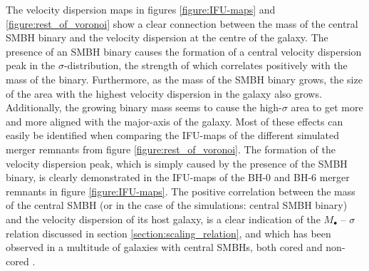 \documentclass[english, twoside]{HYgradu}
\begin{document}
The velocity dispersion maps in figures \ref{figure:IFU-maps} and \ref{figure:rest_of_voronoi} show a clear connection between the mass of the central SMBH binary and the velocity dispersion at the centre of the galaxy. The presence of an SMBH binary causes the formation of a central velocity dispersion peak in the $\sigma$-distribution, the strength of which correlates positively with the mass of the binary. Furthermore, as the mass of the SMBH binary grows, the size of the area with the highest velocity dispersion in the galaxy also grows. Additionally, the growing binary mass seems to cause the high-$\sigma$ area to get more and more aligned with the major-axis of the galaxy. Most of these effects can easily be identified when comparing the IFU-maps of the different simulated merger remnants from figure \ref{figure:rest_of_voronoi}. The formation of the velocity dispersion peak, which is simply caused by the presence of the SMBH binary, is clearly demonstrated in the IFU-maps of the BH-0 and BH-6 merger remnants in figure \ref{figure:IFU-maps}. The positive correlation between the mass of the central SMBH (or in the case of the simulations: central SMBH binary) and the velocity dispersion of its host galaxy, is a clear indication of the $M_\bullet$ – $\sigma$ relation discussed in section \ref{section:scaling_relation}, and which has been observed in a multitude of galaxies with central SMBHs, both cored and non-cored \citep{Ferrarese2000}.
\end{document}
